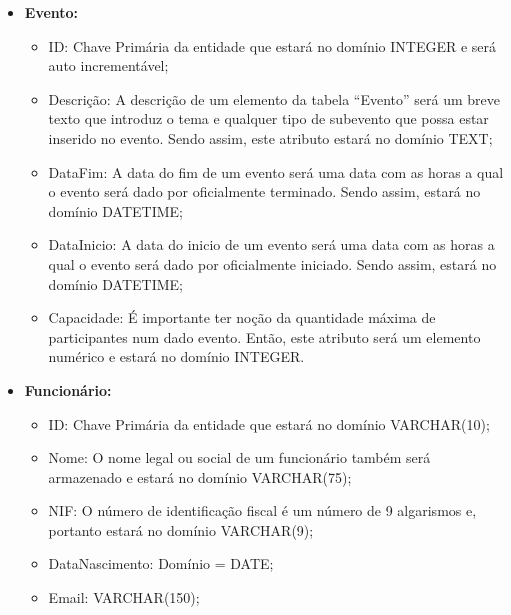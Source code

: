 \documentclass[a4paper,12pt]{scrreprt}
\begin{document}
             \begin{itemize}
                 \item{\textbf{Evento:}} 
                     \begin{itemize}
                     \item{ID:} Chave Primária da entidade que estará no domínio INTEGER
                       e será auto incrementável;
                     \item{Descrição:} A descrição de um elemento da tabela ``Evento'' será
                       um breve texto que introduz o tema e qualquer tipo de subevento que possa
                       estar inserido no evento. Sendo assim, este atributo estará no domínio TEXT;
                     \item{DataFim:} A data do fim de um evento será uma data com as horas a qual
                       o evento será dado por oficialmente terminado. Sendo assim, estará no domínio
                       DATETIME;
                     \item{DataInicio:} A data do inicio de um evento será uma data com as horas a qual
                       o evento será dado por oficialmente iniciado. Sendo assim, estará no domínio
                       DATETIME;
                     \item{Capacidade:} É importante ter noção da quantidade máxima de participantes num
                       dado evento. Então, este atributo será um elemento numérico e estará no domínio INTEGER.
                     \end{itemize}
                 \item{\textbf{Funcionário:}}
                     \begin{itemize}
                     \item{ID:} Chave Primária da entidade que estará no domínio VARCHAR(10);
                     \item{Nome:} O nome legal ou social de um funcionário também será armazenado e estará
                       no domínio VARCHAR(75);
                     \item{NIF:} O número de identificação fiscal é um número de 9 algarismos e, portanto estará
                       no domínio VARCHAR(9);
                     \item{DataNascimento:} Domínio = DATE;
                       
                     \item{Email:} VARCHAR(150);
                       

\end{itemize}
\end{itemize}
\end{document}
